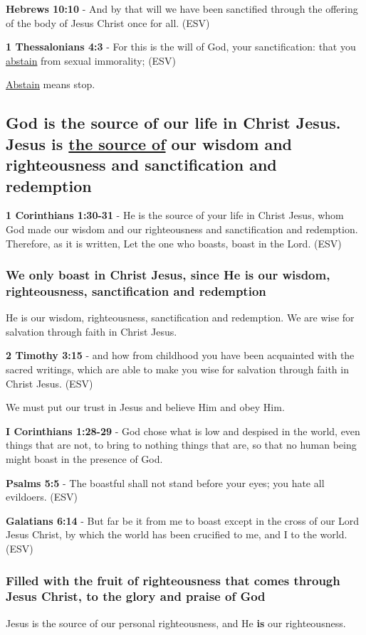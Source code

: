 \documentclass[11pt]{article}
\begin{document}
\textbf{Hebrews 10:10} - And by that will we have been sanctified through the offering of the body of Jesus Christ once for all. (ESV)

\textbf{1 Thessalonians 4:3} -  For this is the will of God, your sanctification: that you \uline{abstain} from sexual immorality;  (ESV)

\uline{Abstain} means stop.

\subsection{God is the source of our life in Christ Jesus. Jesus is \underline{the source of} our wisdom and righteousness and sanctification and redemption}
\label{sec:org9bf1287}
\textbf{1 Corinthians 1:30-31} -  He is the source of your life in Christ Jesus, whom God made our wisdom and our righteousness and sanctification and redemption.  Therefore, as it is written, Let the one who boasts, boast in the Lord.  (ESV)

\subsubsection{We only boast in Christ Jesus, since He is our wisdom, righteousness, sanctification and redemption}
\label{sec:orgd3c204e}
He is our wisdom, righteousness, sanctification and redemption.
We are wise for salvation through faith in Christ Jesus.

\textbf{2 Timothy 3:15} -  and how from childhood you have been acquainted with the sacred writings, which are able to make you wise for salvation through faith in Christ Jesus.  (ESV)

We must put our trust in Jesus and believe Him and obey Him.

\textbf{I Corinthians 1:28-29} - God chose what is low and despised in the world, even things that are not, to bring to nothing things that are, so that no human being might boast in the presence of God.

\textbf{Psalms 5:5} -  The boastful shall not stand before your eyes; you hate all evildoers.  (ESV)

\textbf{Galatians 6:14} -  But far be it from me to boast except in the cross of our Lord Jesus Christ, by which the world has been crucified to me, and I to the world.  (ESV)

\subsubsection{Filled with the fruit of righteousness that comes through Jesus Christ, to the glory and praise of God}
\label{sec:orgbea2691}
Jesus is the source of our personal righteousness, and He \textbf{is} our righteousness.
\end{document}
